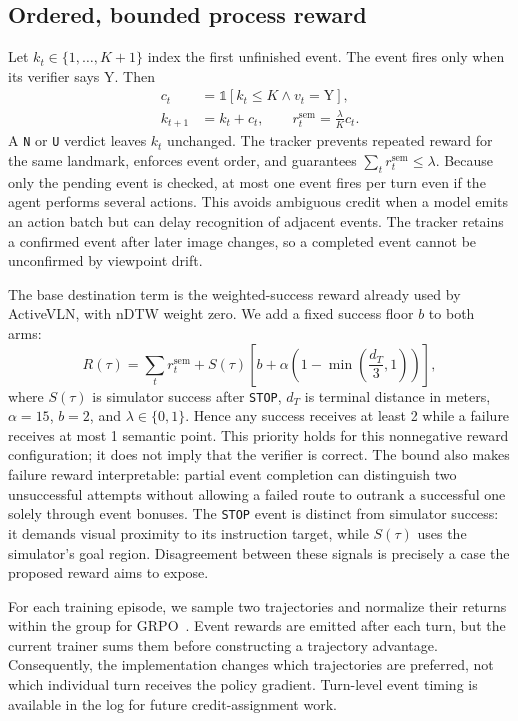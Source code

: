 \documentclass[10pt,twocolumn,letterpaper]{article}
\begin{document}
\subsection{Ordered, bounded process reward}
Let $k_t\in\{1,\ldots,K+1\}$ index the first unfinished event. The event fires only when its verifier says $\mathrm{Y}$. Then
\begin{align}
c_t &= \mathbb{1}[k_t\leq K\land v_t=\mathrm{Y}],\\
k_{t+1} &= k_t+c_t,\qquad
r_t^{\mathrm{sem}}=\frac{\lambda}{K}c_t.
\label{eq:events}
\end{align}
A \texttt{N} or \texttt{U} verdict leaves $k_t$ unchanged. The tracker prevents repeated reward for the same landmark, enforces event order, and guarantees $\sum_t r_t^{\mathrm{sem}}\leq\lambda$.
Because only the pending event is checked, at most one event fires per turn even if the agent performs several actions. This avoids ambiguous credit when a model emits an action batch but can delay recognition of adjacent events. The tracker retains a confirmed event after later image changes, so a completed event cannot be unconfirmed by viewpoint drift.

The base destination term is the weighted-success reward already used by ActiveVLN, with nDTW weight zero. We add a fixed success floor $b$ to both arms:
\begin{equation}
R(\tau)=\sum_t r_t^{\mathrm{sem}}
+S(\tau)\left[b+\alpha\left(1-\min\left(\frac{d_T}{3},1\right)\right)\right],
\label{eq:return}
\end{equation}
where $S(\tau)$ is simulator success after \texttt{STOP}, $d_T$ is terminal distance in meters, $\alpha=15$, $b=2$, and $\lambda\in\{0,1\}$. Hence any success receives at least 2 while a failure receives at most 1 semantic point. This priority holds for this nonnegative reward configuration; it does not imply that the verifier is correct.
The bound also makes failure reward interpretable: partial event completion can distinguish two unsuccessful attempts without allowing a failed route to outrank a successful one solely through event bonuses. The \texttt{STOP} event is distinct from simulator success: it demands visual proximity to its instruction target, while $S(\tau)$ uses the simulator's goal region. Disagreement between these signals is precisely a case the proposed reward aims to expose.

For each training episode, we sample two trajectories and normalize their returns within the group for GRPO~\cite{shao2024deepseekmath}. Event rewards are emitted after each turn, but the current trainer sums them before constructing a trajectory advantage. Consequently, the implementation changes which trajectories are preferred, not which individual turn receives the policy gradient. Turn-level event timing is available in the log for future credit-assignment work.
\end{document}
